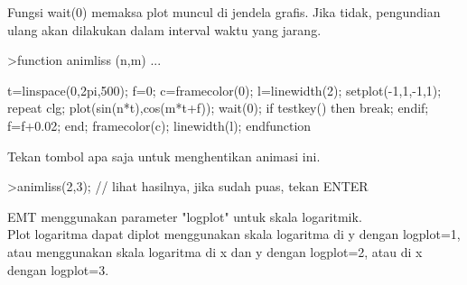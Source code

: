 \documentclass{article}
\begin{document}
\begin{eulernotebook}
\begin{eulercomment}
\begin{eulercomment}
\begin{eulercomment}
\begin{eulercomment}
\begin{eulercomment}
\begin{eulercomment}
\begin{eulercomment}
\begin{eulercomment}
\begin{eulercomment}
\begin{eulercomment}
\begin{eulercomment}
\begin{eulercomment}
\begin{eulercomment}
\begin{eulercomment}
\begin{eulercomment}
Fungsi wait(0) memaksa plot muncul di jendela grafis. Jika tidak,
pengundian ulang akan dilakukan dalam interval waktu yang jarang.
\end{eulercomment}
\begin{eulerprompt}
>function animliss (n,m) ...
\end{eulerprompt}
\begin{eulerudf}
  t=linspace(0,2pi,500);
  f=0;
  c=framecolor(0);
  l=linewidth(2);
  setplot(-1,1,-1,1);
  repeat
    clg;
    plot(sin(n*t),cos(m*t+f));
    wait(0);
    if testkey() then break; endif;
    f=f+0.02;
  end;
  framecolor(c);
  linewidth(l);
  endfunction
\end{eulerudf}
\begin{eulercomment}
Tekan tombol apa saja untuk menghentikan animasi ini.
\end{eulercomment}
\begin{eulerprompt}
>animliss(2,3); // lihat hasilnya, jika sudah puas, tekan ENTER
\end{eulerprompt}
\begin{eulercomment}
EMT menggunakan parameter "logplot" untuk skala logaritmik.\\
Plot logaritma dapat diplot menggunakan skala logaritma di y dengan
logplot=1, atau menggunakan skala logaritma di x dan y dengan
logplot=2, atau di x dengan logplot=3.


\end{eulercomment}
\end{eulercomment}
\end{eulercomment}
\end{eulercomment}
\end{eulercomment}
\end{eulercomment}
\end{eulercomment}
\end{eulercomment}
\end{eulercomment}
\end{eulercomment}
\end{eulercomment}
\end{eulercomment}
\end{eulercomment}
\end{eulercomment}
\end{eulercomment}
\end{eulernotebook}
\end{document}
